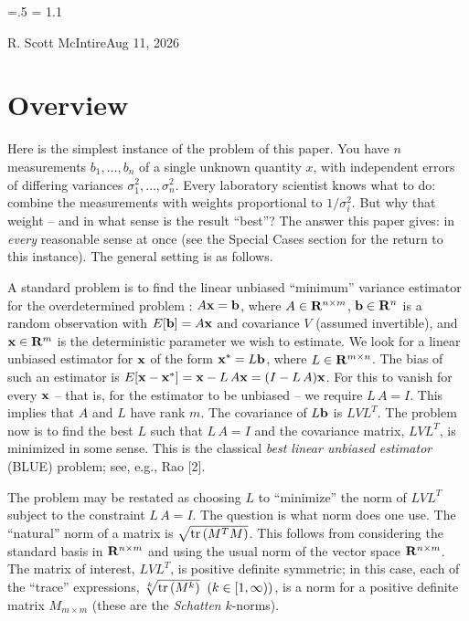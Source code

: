 

\parindent=0pt
\parskip=.5\baselineskip
\baselineskip = 1.1\baselineskip

\footline{\hss\tenrm\folio\hss}

{R. Scott McIntire}{Aug 11, 2026}

\section{Overview}
Here is the simplest instance of the problem of this paper. You have $n$
measurements $b_1, \ldots, b_n$ of a single unknown quantity $x$, with
independent errors of differing variances $\sigma_1^2, \ldots,
\sigma_n^2$. Every laboratory scientist knows what to do: combine the
measurements with weights proportional to $1/\sigma_i^2$. But why that
weight -- and in what sense is the result ``best''? The answer this paper
gives: in {\it every\/} reasonable sense at once (see the Special Cases
section for the return to this instance). The general setting is as
follows.

A standard problem is to find the linear unbiased ``minimum'' variance estimator
for the overdetermined problem%
: $A {\bf x} = {\bf b}$, where
$A \in {\bf R}^{n \times m}$, ${\bf b} \in {\bf R}^n$ is a random observation
with $E[{\bf b}] = A {\bf x}$ and covariance $V$ (assumed invertible), and
${\bf x} \in {\bf R}^m$ is the deterministic parameter we wish to estimate.
We look for a linear unbiased estimator for ${\bf x}$ of the form
${\bf x}^* = L {\bf b}$, where $L\in {\bf R}^{m \times n}$. The bias of such
an estimator is
$E[{\bf x} - {\bf x}^*] = {\bf x} - L\, A {\bf x} = (I - L\, A){\bf x}$. For this
to vanish for every ${\bf x}$ -- that is, for the estimator to be unbiased --
we require $L\, A = I$. This implies that $A$
and $L$ have rank $m$.
The covariance of $L{\bf b}$ is $LVL^T$. The problem now is to find
the best $L$ such that $L\, A = I$ and the covariance matrix, $LVL^T$, is
minimized in some sense. This is the classical {\it best linear unbiased
estimator\/} (BLUE) problem; see, e.g., Rao [2].

The problem may be restated as choosing $L$ to ``minimize'' the norm of $LVL^T$
subject to the constraint $L\, A = I$. The question is what norm does one
use. The ``natural'' norm of a matrix is $\sqrt{{\rm tr}\left(M^TM\right)}$. This
follows from considering the standard basis in ${\bf R}^{n \times m}$ and
using the usual norm of the vector space ${\bf R}^{n \times m}$.
The matrix of interest, $LVL^T$, is positive definite
symmetric; in this case, each of the ``trace''
expressions, $\root k \of {{\rm  tr}\left(M^k\right)} \;\; (k \in [1,\infty ))$, is a norm for a
positive definite matrix $M_{m \times m}$ (these are the {\it Schatten\/} $k$-norms).

